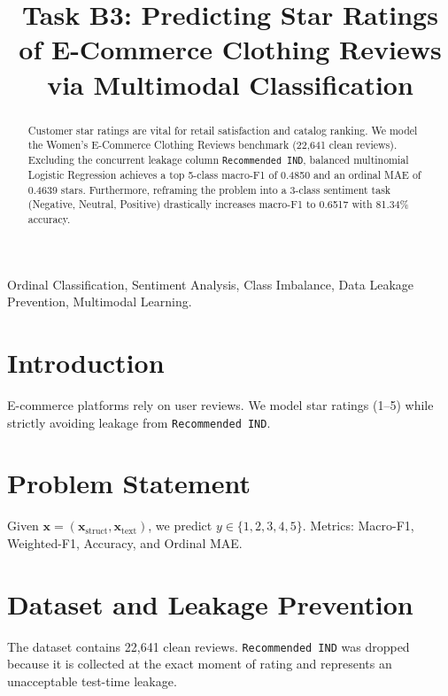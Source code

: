 \documentclass[conference]{IEEEtran}
\begin{document}
\title{Task B3: Predicting Star Ratings of E-Commerce Clothing Reviews via Multimodal Classification}

\author{
}

\maketitle

\begin{abstract}
Customer star ratings are vital for retail satisfaction and catalog ranking. We model the Women's E-Commerce Clothing Reviews benchmark (22,641 clean reviews). Excluding the concurrent leakage column \texttt{Recommended IND}, balanced multinomial Logistic Regression achieves a top 5-class macro-F1 of 0.4850 and an ordinal MAE of 0.4639 stars. Furthermore, reframing the problem into a 3-class sentiment task (Negative, Neutral, Positive) drastically increases macro-F1 to 0.6517 with 81.34\% accuracy.
\end{abstract}

\begin{IEEEkeywords}
Ordinal Classification, Sentiment Analysis, Class Imbalance, Data Leakage Prevention, Multimodal Learning.
\end{IEEEkeywords}

\section{Introduction}
E-commerce platforms rely on user reviews. We model star ratings (1--5) while strictly avoiding leakage from \texttt{Recommended IND}.

\section{Problem Statement}
Given $\mathbf{x} = (\mathbf{x}_{\text{struct}}, \mathbf{x}_{\text{text}})$, we predict $y \in \{1, 2, 3, 4, 5\}$. Metrics: Macro-F1, Weighted-F1, Accuracy, and Ordinal MAE.

\section{Dataset and Leakage Prevention}
The dataset contains 22,641 clean reviews. \texttt{Recommended IND} was dropped because it is collected at the exact moment of rating and represents an unacceptable test-time leakage.
\end{document}
